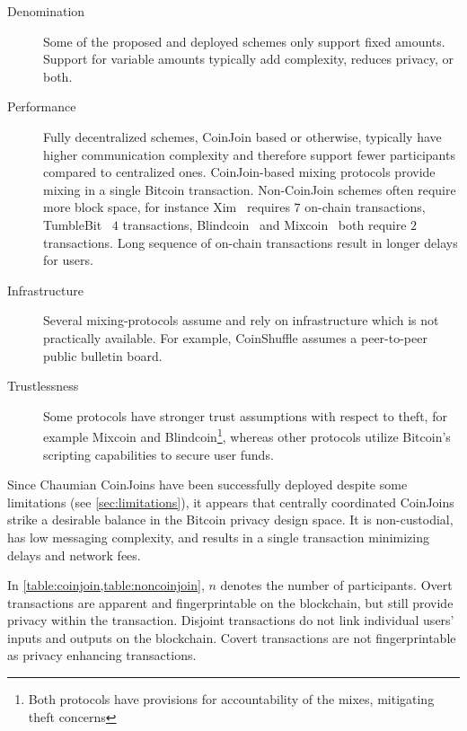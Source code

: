 \documentclass[a4paper]{article}
\begin{document}
\begin{description}
 \item[Denomination] Some of the proposed and deployed schemes only support fixed amounts. Support for variable amounts typically add complexity, reduces privacy, or both.
 \item[Performance] Fully decentralized schemes, CoinJoin based or otherwise, typically have higher communication complexity and therefore support fewer participants compared to centralized ones. CoinJoin-based mixing protocols provide mixing in a single Bitcoin transaction. Non-CoinJoin schemes often require more block space, for instance Xim~\cite{bissias2014sybil} requires $7$ on-chain transactions, TumbleBit~\cite{heilman2017tumblebit} $4$ transactions, Blindcoin~\cite{valenta2015blindcoin} and Mixcoin~\cite{bonneau2014mixcoin} both require $2$ transactions. Long sequence of on-chain transactions result in longer delays for users.
 \item[Infrastructure] Several mixing-protocols assume and rely on infrastructure which is not practically available. For example, CoinShuffle assumes a peer-to-peer public bulletin board.
 \item[Trustlessness] Some protocols have stronger trust assumptions with respect to theft, for example Mixcoin and Blindcoin\footnote{Both protocols have provisions for accountability of the mixes, mitigating theft concerns}, whereas other protocols utilize Bitcoin's scripting capabilities to secure user funds.
\end{description}

Since Chaumian CoinJoins have been successfully deployed despite some limitations (see \cref{sec:limitations}), it appears that centrally coordinated CoinJoins strike a desirable balance in the Bitcoin privacy design space. It is non-custodial, has low messaging complexity, and results in a single transaction minimizing delays and network fees.

In \cref{table:coinjoin,table:noncoinjoin}, $n$ denotes the number of participants. Overt transactions are apparent and fingerprintable on the blockchain, but still provide privacy within the transaction. Disjoint transactions do not link individual users' inputs and outputs on the blockchain. Covert transactions are not fingerprintable as privacy enhancing transactions.
\end{document}

